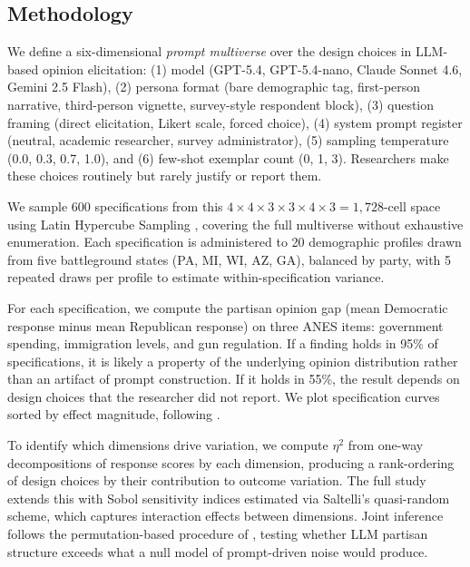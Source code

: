 \documentclass{article}
\begin{document}
\subsection*{Methodology}

We define a six-dimensional \textit{prompt multiverse} over the design choices in LLM-based opinion elicitation:
(1) model (GPT-5.4, GPT-5.4-nano, Claude Sonnet 4.6, Gemini 2.5 Flash),
(2) persona format (bare demographic tag, first-person narrative, third-person vignette, survey-style respondent block),
(3) question framing (direct elicitation, Likert scale, forced choice),
(4) system prompt register (neutral, academic researcher, survey administrator),
(5) sampling temperature (0.0, 0.3, 0.7, 1.0), and
(6) few-shot exemplar count (0, 1, 3).
Researchers make these choices routinely but rarely justify or report them.

We sample 600 specifications from this $4 \times 4 \times 3 \times 3 \times 4 \times 3 = 1{,}728$-cell space using Latin Hypercube Sampling \citep{mckay1979comparison}, covering the full multiverse without exhaustive enumeration.
Each specification is administered to 20 demographic profiles drawn from five battleground states (PA, MI, WI, AZ, GA), balanced by party, with 5 repeated draws per profile to estimate within-specification variance.

For each specification, we compute the partisan opinion gap (mean Democratic response minus mean Republican response) on three ANES items: government spending, immigration levels, and gun regulation.
If a finding holds in 95\% of specifications, it is likely a property of the underlying opinion distribution rather than an artifact of prompt construction.
If it holds in 55\%, the result depends on design choices that the researcher did not report.
We plot specification curves sorted by effect magnitude, following \citet{simonsohn2020specification}.

To identify which dimensions drive variation, we compute $\eta^2$ from one-way decompositions of response scores by each dimension, producing a rank-ordering of design choices by their contribution to outcome variation.
The full study extends this with Sobol sensitivity indices \citep{saltelli2008global} estimated via Saltelli's quasi-random scheme, which captures interaction effects between dimensions.
Joint inference follows the permutation-based procedure of \citet{simonsohn2020specification}, testing whether LLM partisan structure exceeds what a null model of prompt-driven noise would produce.
\end{document}
